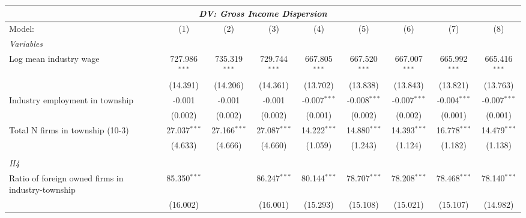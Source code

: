 \begingroup
\centering
\begin{tabular}{lcccccccc}
   \tabularnewline \multicolumn{9}{c}{\textit{DV: Gross Income Dispersion}} \\ \midrule \midrule
   Model:                                                & (1)             & (2)             & (3)             & (4)              & (5)              & (6)              & (7)              & (8)\\  
   \midrule
   \emph{Variables}\\
   Log mean industry wage                                & 727.986$^{***}$ & 735.319$^{***}$ & 729.744$^{***}$ & 667.805$^{***}$  & 667.520$^{***}$  & 667.007$^{***}$  & 665.992$^{***}$  & 665.416$^{***}$\\   
                                                         & (14.391)        & (14.206)        & (14.361)        & (13.702)         & (13.838)         & (13.843)         & (13.821)         & (13.763)\\   
   Industry employment in township                       & -0.001          & -0.001          & -0.001          & -0.007$^{***}$   & -0.008$^{***}$   & -0.007$^{***}$   & -0.004$^{***}$   & -0.007$^{***}$\\   
                                                         & (0.002)         & (0.002)         & (0.002)         & (0.001)          & (0.002)          & (0.002)          & (0.001)          & (0.001)\\   
   Total N firms in township (10-3)                      & 27.037$^{***}$  & 27.166$^{***}$  & 27.087$^{***}$  & 14.222$^{***}$   & 14.880$^{***}$   & 14.393$^{***}$   & 16.778$^{***}$   & 14.479$^{***}$\\   
                                                         & (4.633)         & (4.666)         & (4.660)         & (1.059)          & (1.243)          & (1.124)          & (1.182)          & (1.138)\\   
\hdashline %
\\[0.1ex] %
\emph{H4} \\ 
   Ratio of foreign owned firms in industry-township     & 85.350$^{***}$  &                 & 86.247$^{***}$  & 80.144$^{***}$   & 78.707$^{***}$   & 78.208$^{***}$   & 78.468$^{***}$   & 78.140$^{***}$\\   
                                                         & (16.002)        &                 & (16.001)        & (15.293)         & (15.108)         & (15.021)         & (15.107)         & (14.982)\\   

\end{tabular}
